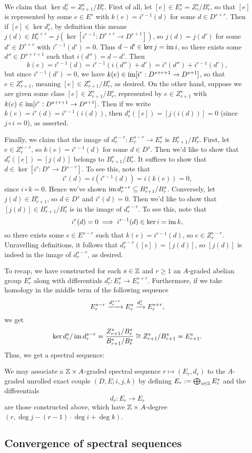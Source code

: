 \documentclass[../main.tex]{subfiles}
\begin{document}
We claim that $\ker d_r^s=Z^s_{r+1}/B^s_r$. First of all, let $[e]\in E_r^s=Z_r^s/B_r^s$, so that $[e]$ is represented by some $e\in E^s$ with $k(e)=i^{r-1}(d)$ for some $d\in D^{s+r}$. Then if $[e]\in\ker d_r^s$, by definition this means $j(d)\in B_r^{s+r}=j(\ker[i^{r-1}:D^{s+r}\to D^{s+1}])$, so $j(d)=j(d')$ for some $d'\in D^{s+r}$ with $i^{r-1}(d')=0$. Thus $d-d'\in\ker j=\operatorname{im} i$, so there exists some $d''\in D^{s+r+1}$ such that $i(d'')=d-d'$. Then
\[k(e)=i^{r-1}(d)=i^{r-1}(i(d'')+d')=i^r(d'')+i^{r-1}(d'),\]
but since $i^{r-1}(d')=0$, we have $k(e)\in\operatorname{im}[i^r:D^{s+r+1}\to D^{s+1}]$, so that $e\in Z^s_{r+1}$, meaning $[e]\in Z^s_{r+1}/B^s_r$, as desired. On the other hand, suppose we are given some class $[e]\in Z^s_{r+1}/B^s_r$, represented by $e\in Z^s_{r+1}$ with $k(e)\in\operatorname{im}[i^r:D^{s+r+1}\to D^{s+1}]$. Then if we write $k(e)=i^r(d)=i^{r-1}(i(d))$, then $d_r^s([e])=[j(i(d))]=0$ (since $j\circ i=0$), as asserted.

Finally, we claim that the image of $d_r^{s-r}:E^{s-r}_r\to E^s_r$ is $B^s_{r+1}/B^s_r$. First, let $e\in Z^{s-r}_r$, so $k(e)=i^{r-1}(d)$ for some $d\in D^{s}$. Then we'd like to show that $d_r^s([e])=[j(d)]$ belongs to $B^s_{r+1}/B^s_r$. It suffices to show that $d\in \ker[i^r:D^s\to D^{s-r}]$. To see this, note that 
\[i^r(d)=i(i^{r-1}(d))=i(k(e))=0,\]
since $i\circ k=0$. Hence we've shown $\operatorname{im} d_r^{s-r}\subseteq B^s_{r+1}/B^s_r$. Conversely, let $j(d)\in B^s_{r+1}$, so $d\in D^s$ and $i^{r}(d)=0$. Then we'd like to show that $[j(d)]\in B^s_{r+1}/B^s_r$ is in the image of $d_r^{s-r}$. To see this, note that
\[i^r(d)=0\implies i^{r-1}(d)\in\ker i=\operatorname{im} k,\]
so there exists some $e\in E^{s-r}$ such that $k(e)=i^{r-1}(d)$, so $e\in Z^{s-r}_r$. Unravelling definitions, it follows that $d_r^{s-r}([e])=[j(d)]$, so $[j(d)]$ is indeed in the image of $d_r^{s-r}$, as desired.

To recap, we have constructed for each $s\in\mathbb{Z}$ and $r\geq1$ an $A$-graded abelian group $E_r^s$ along with differentials $d_r^s:E_r^s\to E_r^{s+r}$. Furthermore, if we take homology in the middle term of the following sequence
\[E_r^{s-r}\xrightarrow{d_r^{s-r}}E_r^s\xrightarrow{d_r^s}E^{s+r}_r,\]
we get
\[\ker d_r^s/\operatorname{im} d_r^{s-r}=\frac{Z_{r+1}^s/B_r^s}{B_{r+1}^s/B_r^s}\cong Z_{r+1}^s/B_{r+1}^s=E_{r+1}^s.\]
Thus, we get a spectral sequence:

\begin{proposition}\label{SSeq_assoc_to_unrolled_EC}
    We may associate a $\mathbb{Z}\times A$-graded spectral sequence $r\mapsto(E_r,d_r)$ to the $A$-graded unrolled exact couple $(D,E;i,j,k)$ by defining $E_r:=\bigoplus_{s\in\mathbb{Z}}E_r^s$ and the differentials 
    \[d_r:E_r\to E_r\]
    are those constructed above, which have $\mathbb{Z}\times A$-degree $(r,\deg j-(r-1)\cdot\deg i+\deg k)$.
\end{proposition}

\subsection{Convergence of spectral sequences}
\end{document}
